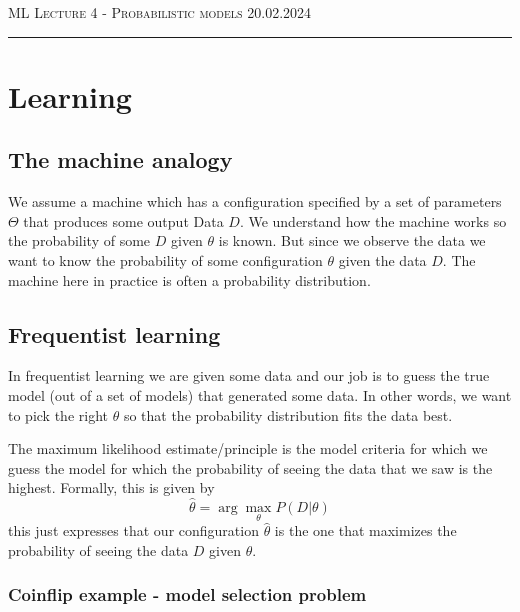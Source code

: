 \documentclass[12pt]{article}
\begin{document}
\thispagestyle{empty}

{\scshape ML } \hfill {\scshape \large Lecture 4 - Probabilistic models} \hfill {\scshape 20.02.2024}
 
\smallskip
\hrule
\bigskip

\tableofcontents

\section{Learning}

\subsection{The machine analogy}

We assume a machine which has a configuration specified by a set of parameters $\Theta$ that produces some output Data $D$. We understand how the machine works so the probability of some $D$ given $\theta$ is known. But since we observe the data we want to know the probability of some configuration $\theta$ given the data $D$. The machine here in practice is often a probability distribution.

\subsection{Frequentist learning}

\begin{definition}
    In frequentist learning we are given some data and our job is to guess the true model (out of a set of models) that generated some data. In other words, we want to pick the right $\theta$ so that the probability distribution fits the data best.
\end{definition}

\begin{definition}
    The maximum likelihood estimate/principle is the model criteria for which we guess the model for which the probability of seeing the data that we saw is the highest. Formally, this is given by 
    \[
        \hat{\theta} = \arg\max_{\theta} P(D|\theta)  
    \]
    this just expresses that our configuration $\hat{\theta}$ is the one that maximizes the probability of seeing the data $D$ given $\theta$.
\end{definition}

\subsubsection*{Coinflip example - model selection problem}
\end{document}
